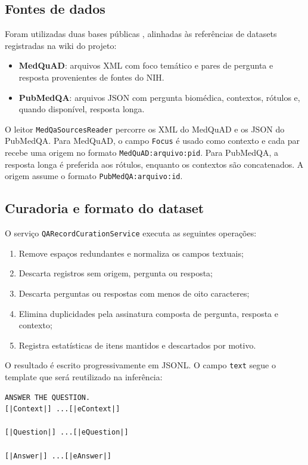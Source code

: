 \documentclass[12pt,a4paper]{article}
\begin{document}
\subsection{Fontes de dados}

Foram utilizadas duas bases públicas \cite{medquad,pubmedqa}, alinhadas às referências de datasets registradas na wiki do projeto:
\begin{itemize}
  \item \textbf{MedQuAD}: arquivos XML com foco temático e pares de pergunta e resposta provenientes de fontes do NIH.
  \item \textbf{PubMedQA}: arquivos JSON com pergunta biomédica, contextos, rótulos e, quando disponível, resposta longa.
\end{itemize}

O leitor \texttt{MedQaSourcesReader} percorre os XML do MedQuAD e os JSON do PubMedQA. Para MedQuAD, o campo \texttt{Focus} é usado como contexto e cada par recebe uma origem no formato \texttt{MedQuAD:arquivo:pid}. Para PubMedQA, a resposta longa é preferida aos rótulos, enquanto os contextos são concatenados. A origem assume o formato \texttt{PubMedQA:arquivo:id}.

\subsection{Curadoria e formato do dataset}

O serviço \texttt{QARecordCurationService} executa as seguintes operações:
\begin{enumerate}
  \item Remove espaços redundantes e normaliza os campos textuais;
  \item Descarta registros sem origem, pergunta ou resposta;
  \item Descarta perguntas ou respostas com menos de oito caracteres;
  \item Elimina duplicidades pela assinatura composta de pergunta, resposta e contexto;
  \item Registra estatísticas de itens mantidos e descartados por motivo.
\end{enumerate}

O resultado é escrito progressivamente em JSONL. O campo \texttt{text} segue o template que será reutilizado na inferência:

\begin{verbatim}
ANSWER THE QUESTION.
[|Context|] ...[|eContext|]

[|Question|] ...[|eQuestion|]

[|Answer|] ...[|eAnswer|]
\end{verbatim}
\end{document}
